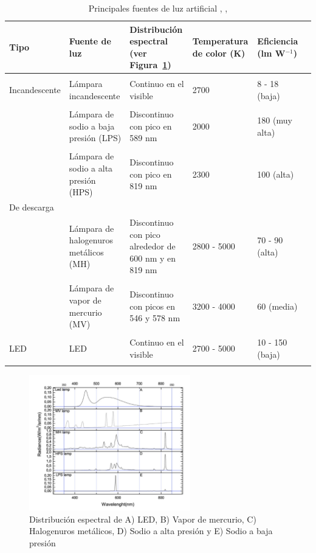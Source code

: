 \begin{table}[htb]
\tiny
\centering
\caption{Principales fuentes de luz artificial \citep{Solano2013b}, \citep{Eldvidge2010}, \citep{LibroCL}}
\label{tab:luzartificial}
\begin{tabular}{llllll}
\hline
\textbf{Tipo} & \textbf{Fuente de luz} & \textbf{Distribución espectral (ver Figura~\ref{distribucionespectral})} & \textbf{Temperatura de color (K)} & \textbf{Eficiencia (lm W$^{-1}$}) \\ \hline
 &  &  &  &  &  \\
Incandescente & Lámpara incandescente & Continuo en el visible & 2700 & 8 - 18 (baja)\\
 &  &  &  &  &  \\
 & Lámpara de sodio a baja presión (LPS) & Discontinuo con pico en 589 nm & 2000 & 180 (muy alta)\\
 &  &  &  &  &  \\
 & Lámpara de sodio a alta presión (HPS) & Discontinuo con pico en 819 nm & 2300 & 100 (alta)\\
De descarga &  &  &  &  &  \\
 & Lámpara de halogenuros metálicos (MH) & Discontinuo con pico alrededor de 600 nm y en 819 nm & 2800 - 5000 & 70 - 90 (alta)\\
 &  &  &  &  &  \\
 & Lámpara de vapor de mercurio (MV) & Discontinuo con picos en 546 y 578 nm & 3200 - 4000 & 60 (media)\\
 &  &  &  &  &  \\
LED & LED & Continuo en el visible & 2700 - 5000 & 10 - 150 (baja)\\
 &  &  &  &  & 
\end{tabular}
\end{table}

\begin{figure}[htb]
  \centering
    \includegraphics[width=70mm, scale=0.7]{distribucionespectral}
  \caption{Distribución espectral de A) LED, B) Vapor de mercurio, C) Halogenuros metálicos, D) Sodio a alta presión y E) Sodio a baja presión \citep{Solano2013b}}
  \label{distribucionespectral}
\end{figure}

